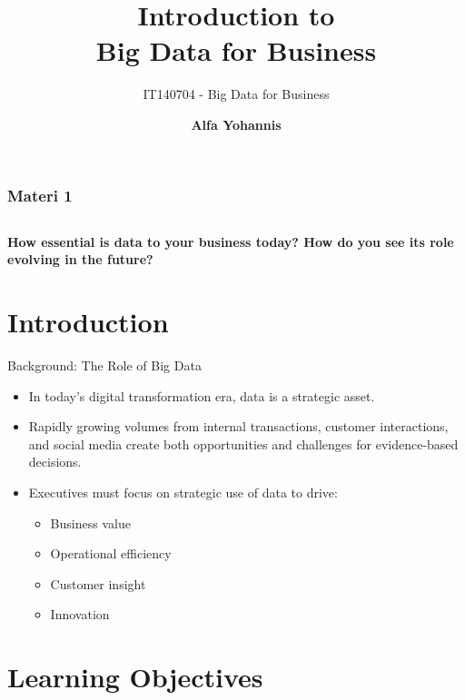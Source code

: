 \documentclass[aspectratio=169, table]{beamer}
\title{\Huge Introduction to\\
	\vspace{10pt}
	Big Data for Business}
\subtitle{IT140704 - Big Data for Business}
\author{\textbf{Alfa Yohannis}}
\begin{document}
	
	\frame{\titlepage}
	
	
	\begin{frame}[fragile]
		\frametitle{Materi 1}
		\vspace{20pt}
		\begin{columns}[t]
			\tableofcontents[sections={1-3}]
			
			\tableofcontents[sections={4-6}]
		\end{columns}
	\end{frame}


\begin{frame}{\hfill}
	\centering
	\Huge{\textbf{How essential is data to your business today? How do you see its role evolving in the future?}}
\end{frame}

\section{Introduction}

\begin{frame}[fragile]{Background: The Role of Big Data}
	
	\begin{itemize}
		\item In today’s digital transformation era, data is a strategic asset.
		\item Rapidly growing volumes from internal transactions, customer interactions, and social media create both opportunities and challenges for evidence-based decisions.

		\item Executives must focus on strategic use of data to drive:
		\begin{itemize}
			\item Business value
			\item Operational efficiency
			\item Customer insight
			\item Innovation
		\end{itemize}
	\end{itemize}
\end{frame}


\section{Learning Objectives}
\end{document}
